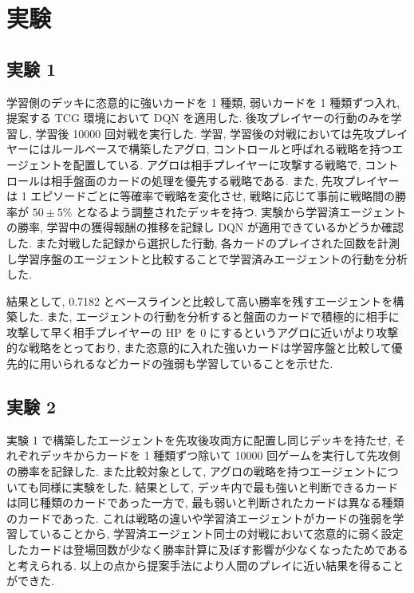 \documentclass[a4paper,twoside,twocolumn,10pt]{article}
\begin{document}
 

\section{実験}
\subsection{実験 1}
 学習側のデッキに恣意的に強いカードを 1 種類, 弱いカードを 1 種類ずつ入れ, 提案する TCG 環境において DQN を適用した. 後攻プレイヤーの行動のみを学習し, 学習後 10000 回対戦を実行した. 学習, 学習後の対戦においては先攻プレイヤーにはルールベースで構築したアグロ, コントロールと呼ばれる戦略を持つエージェントを配置している. アグロは相手プレイヤーに攻撃する戦略で, コントロールは相手盤面のカードの処理を優先する戦略である. また, 先攻プレイヤーは 1 エピソードごとに等確率で戦略を変化させ, 戦略に応じて事前に戦略間の勝率が $50 \pm 5\%$ となるよう調整されたデッキを持つ. 実験から学習済エージェントの勝率, 学習中の獲得報酬の推移を記録し DQN が適用できているかどうか確認した. また対戦した記録から選択した行動, 各カードのプレイされた回数を計測し学習序盤のエージェントと比較することで学習済みエージェントの行動を分析した.
\par
結果として, 0.7182 とベースラインと比較して高い勝率を残すエージェントを構築した. また, エージェントの行動を分析すると盤面のカードで積極的に相手に攻撃して早く相手プレイヤーの HP を 0 にするというアグロに近いがより攻撃的な戦略をとっており, また恣意的に入れた強いカードは学習序盤と比較して優先的に用いられるなどカードの強弱も学習していることを示せた.
\subsection{実験 2}
実験 1 で構築したエージェントを先攻後攻両方に配置し同じデッキを持たせ, それぞれデッキからカードを 1 種類ずつ除いて 10000 回ゲームを実行して先攻側の勝率を記録した. また比較対象として, アグロの戦略を持つエージェントについても同様に実験をした. 結果として, デッキ内で最も強いと判断できるカードは同じ種類のカードであった一方で, 最も弱いと判断されたカードは異なる種類のカードであった. これは戦略の違いや学習済エージェントがカードの強弱を学習していることから, 学習済エージェント同士の対戦において恣意的に弱く設定したカードは登場回数が少なく勝率計算に及ぼす影響が少なくなったためであると考えられる. 以上の点から提案手法により人間のプレイに近い結果を得ることができた.
\end{document}
